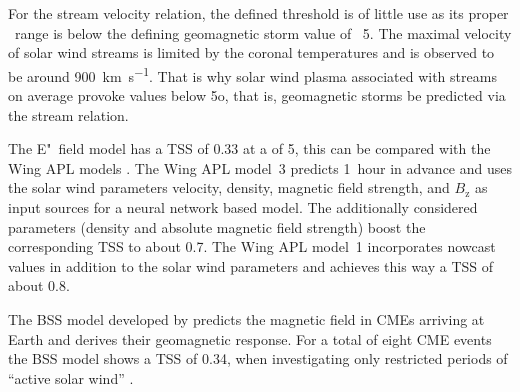For the stream velocity relation, the defined \Kp{} threshold is of little use as its proper \Kp~range is below the defining geomagnetic storm value of \Kp{}~5. The maximal velocity of solar wind streams is limited by the coronal temperatures \citep{Parker1958} and is observed to be around \SI{900}{\km\per\s}. That is why solar wind plasma associated with streams on average provoke \Kp{} values below 5o, that is, geomagnetic storms  be predicted via the stream relation.

The E"~field model has a TSS of 0.33 at a \Kp{} of 5, this can be compared with the Wing APL models \citep[Fig.~13]{Wing2005}. The Wing APL model~3 predicts \Kp{} 1~hour in advance and uses the solar wind parameters velocity, density, magnetic field strength, and $B_\text{z}$ as input sources for a neural network based model. The additionally considered parameters (density and absolute magnetic field strength) boost the corresponding TSS to about 0.7. The Wing APL model~1 incorporates \Kp{} nowcast values in addition to the solar wind parameters and achieves this way a TSS of about 0.8.

The BSS model developed by \citet{Savani2015,Savani2017} predicts the magnetic field in CMEs arriving at Earth and derives their geomagnetic response. For a total of eight CME events the BSS model shows a TSS of 0.34, when investigating only restricted periods of ``active solar wind'' \citep[Tab.~3]{Savani2017}.


